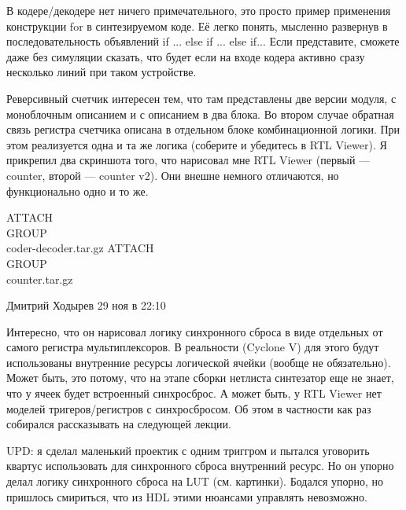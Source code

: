 \documentclass[a4paper, 12pt]{extarticle}
\begin{document}
В кодере/декодере нет ничего примечательного, это просто пример применения конструкции for в синтезируемом коде. Её легко понять, мысленно развернув в последовательность объявлений if ... else if ... else if... Если представите, сможете даже без симуляции сказать, что будет если на входе кодера активно сразу несколько линий при таком устройстве.

Реверсивный счетчик интересен тем, что там представлены две версии модуля, с моноблочным описанием и с описанием в два блока. Во втором случае обратная связь регистра счетчика описана в отдельном блоке комбинационной логики. При этом реализуется одна и та же логика (соберите и убедитесь в RTL Viewer). Я прикрепил два скриншота того, что нарисовал мне RTL Viewer (первый — counter, второй — counter v2). Они внешне немного отличаются, но функционально одно и то же.

ATTACH\\GROUP\\coder-decoder.tar.gz
ATTACH\\GROUP\\counter.tar.gz


Дмитрий Ходырев 29 ноя в 22:10

Интересно, что он нарисовал логику синхронного сброса в виде отдельных от самого регистра мультиплексоров. В реальности (Cyclone V) для этого будут использованы внутренние ресурсы логической ячейки (вообще не обязательно). Может быть, это потому, что на этапе сборки нетлиста синтезатор еще не знает, что у ячеек будет встроенный синхросброс. А может быть, у RTL Viewer нет моделей тригеров/регистров с синхросбросом. Об этом в частности как раз собирался рассказывать на следующей лекции.

UPD: я сделал маленький проектик с одним триггром и пытался уговорить квартус использовать для синхронного сброса внутренний ресурс. Но он упорно делал логику синхронного сброса на LUT (см. картинки). Бодался упорно, но пришлось смириться, что из HDL этими нюансами управлять невозможно.

\end{document}
